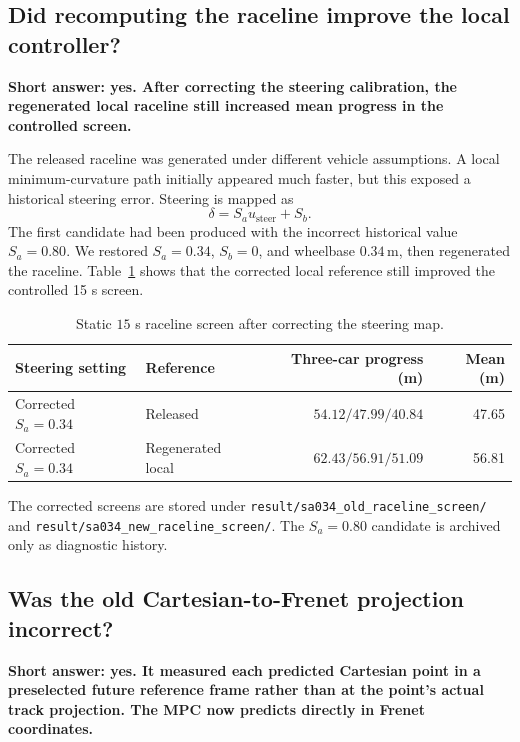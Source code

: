 \documentclass[11pt]{article}
\begin{document}
\subsection{Did recomputing the raceline improve the local controller?}

\noindent\textbf{Short answer: yes. After correcting the steering calibration,
the regenerated local raceline still increased mean progress in the controlled
screen.}

The released raceline was generated under different vehicle assumptions. A
local minimum-curvature path initially appeared much faster, but this exposed a
historical steering error. Steering is mapped as
\[
  \delta=S_a u_{\mathrm{steer}}+S_b.
\]
The first candidate had been produced with the incorrect historical value
$S_a=0.80$. We restored $S_a=0.34$, $S_b=0$, and wheelbase $0.34\,\mathrm m$,
then regenerated the raceline. Table~\ref{tab:raceline-screen} shows that the
corrected local reference still improved the controlled 15 s screen.

\begin{table}[ht]
  \centering
  \small
  \begin{tabular}{llrr}
    \toprule
    Steering setting & Reference & Three-car progress (m) & Mean (m) \\
    \midrule
    Corrected $S_a=0.34$ & Released
      & $54.12/47.99/40.84$ & 47.65 \\
    Corrected $S_a=0.34$ & Regenerated local
      & $62.43/56.91/51.09$ & 56.81 \\
    \bottomrule
  \end{tabular}
  \caption{Static $15$ s raceline screen after correcting the steering map.}
  \label{tab:raceline-screen}
\end{table}

The corrected screens are stored under
\texttt{result/sa034\_old\_raceline\_screen/} and
\texttt{result/sa034\_new\_raceline\_screen/}. The $S_a=0.80$ candidate is
archived only as diagnostic history.

\subsection{Was the old Cartesian-to-Frenet projection incorrect?}

\noindent\textbf{Short answer: yes. It measured each predicted Cartesian point
in a preselected future reference frame rather than at the point's actual track
projection. The MPC now predicts directly in Frenet coordinates.}
\end{document}
